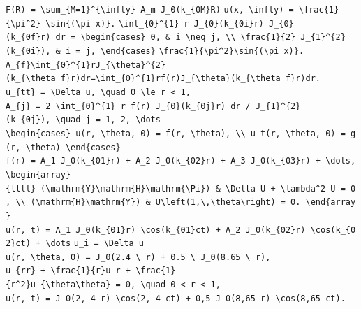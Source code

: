 \documentclass[
  ukrainian,
]{article}
\begin{document}
\texttt{F(R)\ =\ \textbackslash{}sum\_\{M=1\}\^{}\{\textbackslash{}infty\}\ A\_m\ J\_0(k\_\{0M\}R)}
\texttt{u(x,\ \textbackslash{}infty)\ =\ \textbackslash{}frac\{1\}\{\textbackslash{}pi\^{}2\}\ \textbackslash{}sin\{(\textbackslash{}pi\ x)\}.}
\texttt{\textbackslash{}int\_\{0\}\^{}\{1\}\ r\ J\_\{0\}(k\_\{0i\}r)\ J\_\{0\}(k\_\{0f\}r)\ dr\ =\ \textbackslash{}begin\{cases\}\ 0,\ \&\ i\ \textbackslash{}neq\ j,\ \textbackslash{}\textbackslash{}\ \textbackslash{}frac\{1\}\{2\}\ J\_\{1\}\^{}\{2\}(k\_\{0i\}),\ \&\ i\ =\ j,\ \textbackslash{}end\{cases\}}
\texttt{\textbackslash{}frac\{1\}\{\textbackslash{}pi\^{}2\}\textbackslash{}sin\{(\textbackslash{}pi\ x)\}.}
\texttt{A\_\{f\}\textbackslash{}int\_\{0\}\^{}\{1\}rJ\_\{\textbackslash{}theta\}\^{}\{2\}(k\_\{\textbackslash{}theta\ f\}r)dr=\textbackslash{}int\_\{0\}\^{}\{1\}rf(r)J\_\{\textbackslash{}theta\}(k\_\{\textbackslash{}theta\ f\}r)dr.}
\texttt{u\_\{tt\}\ =\ \textbackslash{}Delta\ u,\ \textbackslash{}quad\ 0\ \textbackslash{}le\ r\ \textless{}\ 1,}
\texttt{A\_\{j\}\ =\ 2\ \textbackslash{}int\_\{0\}\^{}\{1\}\ r\ f(r)\ J\_\{0\}(k\_\{0j\}r)\ dr\ /\ J\_\{1\}\^{}\{2\}(k\_\{0j\}),\ \textbackslash{}quad\ j\ =\ 1,\ 2,\ \textbackslash{}dots}
\texttt{\textbackslash{}begin\{cases\}\ u(r,\ \textbackslash{}theta,\ 0)\ =\ f(r,\ \textbackslash{}theta),\ \textbackslash{}\textbackslash{}\ u\_t(r,\ \textbackslash{}theta,\ 0)\ =\ g(r,\ \textbackslash{}theta)\ \textbackslash{}end\{cases\}}
\texttt{f(r)\ =\ A\_1\ J\_0(k\_\{01\}r)\ +\ A\_2\ J\_0(k\_\{02\}r)\ +\ A\_3\ J\_0(k\_\{03\}r)\ +\ \textbackslash{}dots,}
\texttt{\textbackslash{}begin\{array\}\{llll\}\ (\textbackslash{}mathrm\{Y\}\textbackslash{}mathrm\{H\}\textbackslash{}mathrm\{\textbackslash{}Pi\})\ \&\ \textbackslash{}Delta\ U\ +\ \textbackslash{}lambda\^{}2\ U\ =\ 0,\ \textbackslash{}\textbackslash{}\ (\textbackslash{}mathrm\{H\}\textbackslash{}mathrm\{Y\})\ \&\ U\textbackslash{}left(1,\textbackslash{},\textbackslash{}theta\textbackslash{}right)\ =\ 0.\ \textbackslash{}end\{array\}}
\texttt{u(r,\ t)\ =\ A\_1\ J\_0(k\_\{01\}r)\ \textbackslash{}cos(k\_\{01\}ct)\ +\ A\_2\ J\_0(k\_\{02\}r)\ \textbackslash{}cos(k\_\{02\}ct)\ +\ \textbackslash{}dots}
\texttt{u\_i\ =\ \textbackslash{}Delta\ u}
\texttt{u(r,\ \textbackslash{}theta,\ 0)\ =\ J\_0(2.4\ \textbackslash{}\ r)\ +\ 0.5\ \textbackslash{}\ J\_0(8.65\ \textbackslash{}\ r),}
\texttt{u\_\{rr\}\ +\ \textbackslash{}frac\{1\}\{r\}u\_r\ +\ \textbackslash{}frac\{1\}\{r\^{}2\}u\_\{\textbackslash{}theta\textbackslash{}theta\}\ =\ 0,\ \textbackslash{}quad\ 0\ \textless{}\ r\ \textless{}\ 1,}
\texttt{u(r,\ t)\ =\ J\_0(2,\ 4\ r)\ \textbackslash{}cos(2,\ 4\ ct)\ +\ 0,5\ J\_0(8,65\ r)\ \textbackslash{}cos(8,65\ ct).}
\end{document}
